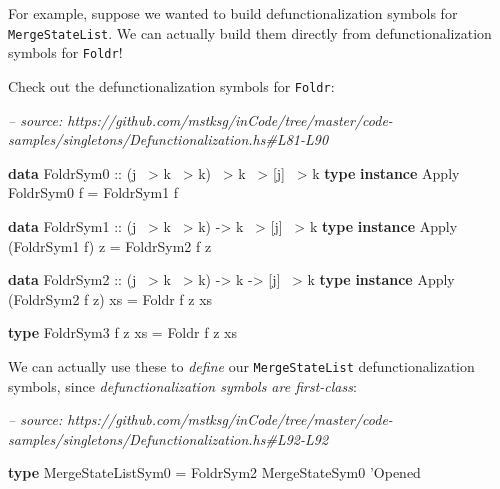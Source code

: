 \documentclass[]{article}
\newenvironment{Shaded}{}{}
\newcommand{\CommentTok}[1]{\textcolor[rgb]{0.38,0.63,0.69}{\textit{#1}}}
\newcommand{\DataTypeTok}[1]{\textcolor[rgb]{0.56,0.13,0.00}{#1}}
\newcommand{\FunctionTok}[1]{\textcolor[rgb]{0.02,0.16,0.49}{#1}}
\newcommand{\KeywordTok}[1]{\textcolor[rgb]{0.00,0.44,0.13}{\textbf{#1}}}
\newcommand{\NormalTok}[1]{#1}
\newcommand{\OtherTok}[1]{\textcolor[rgb]{0.00,0.44,0.13}{#1}}
\begin{document}
For example, suppose we wanted to build defunctionalization symbols for
\texttt{MergeStateList}. We can actually build them directly from
defunctionalization symbols for \texttt{Foldr}!

Check out the defunctionalization symbols for \texttt{Foldr}:

\begin{Shaded}
\begin{Highlighting}[]
\CommentTok{-- source: https://github.com/mstksg/inCode/tree/master/code-samples/singletons/Defunctionalization.hs#L81-L90}

\KeywordTok{data} \DataTypeTok{FoldrSym0}\OtherTok{ ::}\NormalTok{ (j }\FunctionTok{~>}\NormalTok{ k }\FunctionTok{~>}\NormalTok{ k) }\FunctionTok{~>}\NormalTok{ k }\FunctionTok{~>}\NormalTok{ [j] }\FunctionTok{~>}\NormalTok{ k}
\KeywordTok{type} \KeywordTok{instance} \DataTypeTok{Apply} \DataTypeTok{FoldrSym0}\NormalTok{ f }\FunctionTok{=} \DataTypeTok{FoldrSym1}\NormalTok{ f}

\KeywordTok{data} \DataTypeTok{FoldrSym1}\OtherTok{ ::}\NormalTok{ (j }\FunctionTok{~>}\NormalTok{ k }\FunctionTok{~>}\NormalTok{ k) }\OtherTok{->}\NormalTok{ k }\FunctionTok{~>}\NormalTok{ [j] }\FunctionTok{~>}\NormalTok{ k}
\KeywordTok{type} \KeywordTok{instance} \DataTypeTok{Apply}\NormalTok{ (}\DataTypeTok{FoldrSym1}\NormalTok{ f) z }\FunctionTok{=} \DataTypeTok{FoldrSym2}\NormalTok{ f z}

\KeywordTok{data} \DataTypeTok{FoldrSym2}\OtherTok{ ::}\NormalTok{ (j }\FunctionTok{~>}\NormalTok{ k }\FunctionTok{~>}\NormalTok{ k) }\OtherTok{->}\NormalTok{ k }\OtherTok{->}\NormalTok{ [j] }\FunctionTok{~>}\NormalTok{ k}
\KeywordTok{type} \KeywordTok{instance} \DataTypeTok{Apply}\NormalTok{ (}\DataTypeTok{FoldrSym2}\NormalTok{ f z) xs }\FunctionTok{=} \DataTypeTok{Foldr}\NormalTok{ f z xs}

\KeywordTok{type} \DataTypeTok{FoldrSym3}\NormalTok{ f z xs }\FunctionTok{=} \DataTypeTok{Foldr}\NormalTok{ f z xs}
\end{Highlighting}
\end{Shaded}

We can actually use these to \emph{define} our \texttt{MergeStateList}
defunctionalization symbols, since \emph{defunctionalization symbols are
first-class}:

\begin{Shaded}
\begin{Highlighting}[]
\CommentTok{-- source: https://github.com/mstksg/inCode/tree/master/code-samples/singletons/Defunctionalization.hs#L92-L92}

\KeywordTok{type} \DataTypeTok{MergeStateListSym0} \FunctionTok{=} \DataTypeTok{FoldrSym2} \DataTypeTok{MergeStateSym0}\NormalTok{ '}\DataTypeTok{Opened}
\end{Highlighting}
\end{Shaded}
\end{document}

